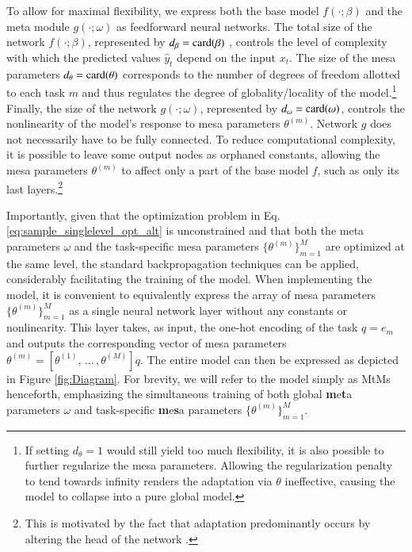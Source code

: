 \documentclass[3p,times,twocolumn]{elsarticle}
\begin{document}
To allow for maximal flexibility, we express both the base model $f(\cdot;\beta)$ and the meta module $g(\cdot;\omega)$ as feedforward neural networks. 
The total size of the network $f(\cdot;\beta)$, represented by $d_{\beta} = \textnormal{card}(\beta)$ , controls the level of complexity with which the predicted values $\hat{y}_{t}$ depend on the input $x_{t}$.
The size of the mesa parameters $d_{\theta}=\textnormal{card}(\theta)$ corresponds to the number of degrees of freedom allotted to each task $m$ and thus regulates the degree of globality/locality of the model.\footnote{
    If setting $d_{\theta}=1$ would still yield too much flexibility, it is also possible to further regularize the mesa parameters. 
    Allowing the regularization penalty to tend towards infinity renders the adaptation via $\theta$ ineffective, causing the model to collapse into a pure global model.
}
Finally, the size of the network $g(\cdot;\omega)$, represented by $d_{\omega} = \textnormal{card}(\omega)$, controls the nonlinearity of the model's response to mesa parameters $\theta^{(m)}$. 
Network $g$ does not necessarily have to be fully connected.
To reduce computational complexity, it is possible to leave some output nodes as orphaned constants, allowing the mesa parameters $\theta^{(m)}$ to affect only a part of the base model $f$, such as only its last layers.\footnote{
    This is motivated by the fact that adaptation predominantly occurs by altering the head of the network \citep{raghuRapidLearningFeature2019, linLearnEffectiveFeatures2020}.
}

Importantly, given that the optimization problem in Eq. \ref{eq:sample_singlelevel_opt_alt} is unconstrained and that both the meta parameters $\omega$ and the task-specific mesa parameters $\{\theta^{(m)}\}_{m=1}^{M}$ are optimized at the same level, the standard backpropagation techniques can be applied, considerably facilitating the training of the model.
When implementing the model, it is convenient to equivalently express the array of mesa parameters $\{\theta^{(m)}\}_{m=1}^{M}$ as a single neural network layer without any constants or nonlinearity.
This layer takes, as input, the one-hot encoding of the task $q=e_{m}$ and outputs the corresponding vector of mesa parameters  $\theta^{(m)} = [\theta^{(1)},\,...\,,\theta^{(M)}]q$.
The entire model can then be expressed as depicted in Figure \ref{fig:Diagram}.
For brevity, we will refer to the model simply as MtMs henceforth, emphasizing the simultaneous training of both global \textbf{m}e\textbf{t}a parameters $\omega$ and task-specific \textbf{m}e\textbf{s}a parameters $\{\theta^{(m)}\}_{m=1}^{M}$.
\end{document}
